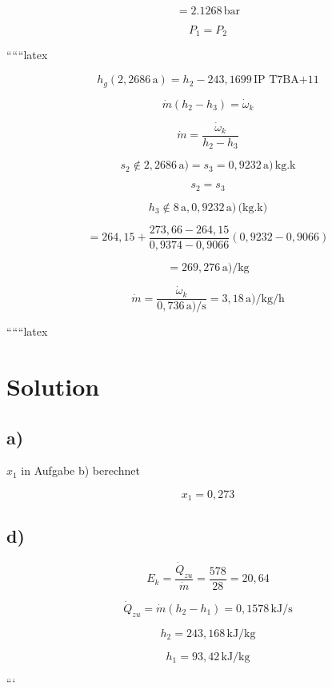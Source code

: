 \[
= 2.1268 \, \text{bar}
\]

\[
P_1 = P_2
\]

``````latex

\[
h_g(2,2686 \, \text{a}) = h_2 - 243,1699 \, \text{IP T7BA+11}
\]

\[
\dot{m}(h_2 - h_3) = \dot{\omega}_k
\]

\[
\dot{m} = \frac{\dot{\omega}_k}{h_2 - h_3}
\]

\[
s_2 \not\in 2,2686 \, \text{a}) = s_3 = 0,9232 \, \text{a}) \, \text{kg.k}
\]

\[
s_2 = s_3
\]

\[
h_3 \not\in 8 \, \text{a}, 0,9232 \, \text{a}) \, \text{(kg.k)}
\]

\[
= 264,15 + \frac{273,66 - 264,15}{0,9374 - 0,9066} (0,9232 - 0,9066)
\]

\[
= 269,276 \, \text{a})/\text{kg}
\]

\[
\dot{m} = \frac{\dot{\omega}_k}{0,736 \, \text{a})/\text{s}} = 3,18 \, \text{a})/\text{kg/h}
\]

``````latex

\section*{Solution}

\subsection*{a)}
$x_1$ in Aufgabe b) berechnet

\[
x_1 = 0{,}273
\]

\subsection*{d)}
\[
E_k = \frac{\dot{Q}_{zu}}{\dot{m}} = \frac{578}{28} = 20{,}64
\]

\[
\dot{Q}_{zu} = \dot{m} (h_2 - h_1) = 0{,}1578 \, \text{kJ/s}
\]

\[
h_2 = 243{,}168 \, \text{kJ/kg}
\]

\[
h_1 = 93{,}42 \, \text{kJ/kg}
\]

```